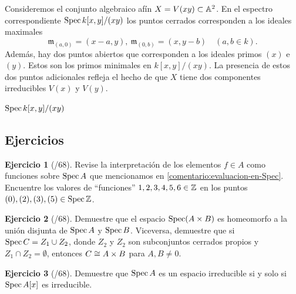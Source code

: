 \documentclass{article}
\numberwithin{equation}{section}
\newcounter{ejerctot}
\newcommand{\ejerccount}{\stepcounter{ejerctot}\theejerctot/68}
\theoremstyle{definition}
\newtheorem{ejerc}{Ejercicio}[section]
\begin{document}
\begin{ejemplo}
  Consideremos el conjunto algebraico afín $X = V (xy) \subset \AA^2$.
  En el espectro correspondiente $\Spec k [x,y]/(xy)$ los puntos cerrados
  corresponden a los ideales maximales
  $$\mathfrak{m}_{(a,0)} = (x-a,y), ~ \mathfrak{m}_{(0,b)} = (x,y-b) \quad (a,b \in k).$$
  Además, hay dos puntos abiertos que corresponden a los ideales primos $(x)$ e
  $(y)$. Estos son los primos minimales en $k[x,y]/(xy)$. La presencia de estos
  dos puntos adicionales refleja el hecho de que $X$ tiene dos componentes
  irreducibles $V (x)$ y $V (y)$.

  \begin{center}

    $\Spec k[x,y]/(xy)$
  \end{center}
\end{ejemplo}

\pagebreak
\subsection{Ejercicios}

\begin{ejerc}[\ejerccount]
  Revise la interpretación de los elementos $f\in A$ como funciones sobre
  $\Spec A$ que mencionamos en \ref{comentario:evaluacion-en-Spec}. Encuentre
  los valores de ``funciones'' $1,2,3,4,5,6 \in \ZZ$ en los puntos
  $(0), (2), (3), (5) \in \Spec\ZZ$.
\end{ejerc}

\begin{ejerc}[\ejerccount]
  \label{ejerc:espectro-de-producto}
  Demuestre que el espacio $\Spec (A\times B)$ es homeomorfo a la unión disjunta
  de $\Spec A$ y $\Spec B$. Viceversa, demuestre que si
  $\Spec C = Z_1 \cup Z_2$, donde $Z_2$ y $Z_2$ son subconjuntos cerrados
  propios y $Z_1 \cap Z_2 = \emptyset$, entonces $C \isom A\times B$ para
  $A,B \ne 0$.

\end{ejerc}

\begin{ejerc}[\ejerccount]
  Demuestre que $\Spec A$ es un espacio irreducible si y solo si $\Spec A[x]$ es
  irreducible.
\end{ejerc}
\end{document}
